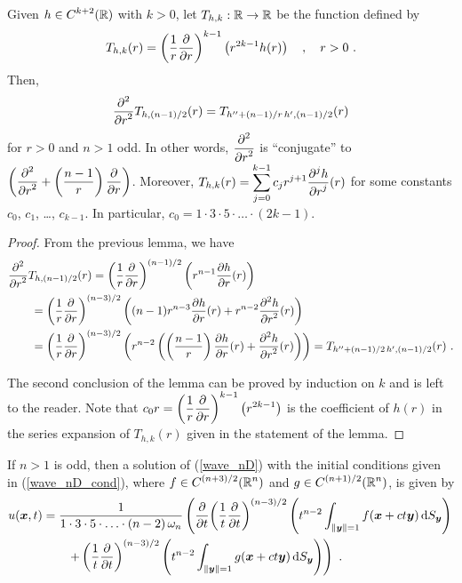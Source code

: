 \begin{lemma} \label{wave_sol_pr2}
Given $\displaystyle h \in C^{k+2}(\RR)$ with $k>0$, let
$T_{h,k}:\RR \rightarrow \RR$ be the function defined by
\[
T_{h,k}(r) = \left(\frac{1}{r}\pdydx{}{r}\right)^{k-1}
\left(r^{2k-1} h(r)\right) \quad , \quad  r >0  \ .
\]
Then,
\[
\pdfdxn{ T_{h,(n-1)/2} }{r}{2}(r) = T_{h'' +(n-1)/r\,h',(n-1)/2}(r)
\]
for $r > 0$ and $n>1$ odd.
In other words, $\displaystyle \pdydxn{}{r}{2}$ is ``conjugate'' to
$\displaystyle \left(\pdydxn{}{r}{2}
+ \left(\frac{n-1}{r}\right)\pdydx{}{r}\right)$.
Moreover,
$\displaystyle
T_{h,k}(r) = \sum_{j=0}^{k-1} c_j r^{j+1} \pdydxn{h}{r}{j}(r)$
for some constants $c_0$, $c_1$, \ldots, $c_{k-1}$.  In particular,
$\displaystyle c_0 = 1 \cdot 3 \cdot 5 \cdot \ldots \cdot (2k-1)$.
\end{lemma}

\begin{proof}
From the previous lemma, we have
\begin{align*}
&\pdfdxn{ T_{h,(n-1)/2} }{r}{2}(r) =
\left(\frac{1}{r} \pdydx{}{r}\right)^{(n-1)/2}
\left( r^{n-1} \pdydx{h}{r}(r)\right) \\
&\qquad = \left(\frac{1}{r} \pdydx{}{r}\right)^{(n-3)/2}
\left( (n-1)r^{n-3} \pdydx{h}{r}(r) + r^{n-2} \pdydxn{h}{r}{2}(r)
\right) \\
&\qquad = \left(\frac{1}{r} \pdydx{}{r}\right)^{(n-3)/2}
\left( r^{n-2} \left( \left( \frac{n-1}{r}\right) \pdydx{h}{r}(r)
+\pdydxn{h}{r}{2}(r) \right) \right)
= T_{h''+(n-1)/2\, h', (n-1)/2}(r) \ .
\end{align*}

The second conclusion of the lemma can be proved by induction on $k$
and is left to the reader.  Note that
$\displaystyle c_0 r = \left(\frac{1}{r}\pdydx{}{r}\right)^{k-1}
\left(r^{2k-1}\right)$ is the coefficient of $h(r)$ in the series
expansion of $T_{h,k}(r)$ given in the statement of the lemma. 
\end{proof}

\begin{theorem} \label{wave_sol_nD_odd}
If $n > 1$ is odd, then a solution of
(\ref{wave_nD}) with the initial conditions given in
(\ref{wave_nD_cond}), where $\displaystyle f\in C^{(n+3)/2}(\RR^n)$ and
$\displaystyle g\in C^{(n+1)/2}(\RR^n)$, is given by
\begin{equation} \label{wave_sol_nD_oddEQ}
\begin{split} 
u(\VEC{x},t) &= \frac{1}{1\cdot 3 \cdot 5 \cdot \ldots \cdot (n-2)
\,\omega_n}
\left( \pdfdx{ \left( \frac{1}{t} \pdydx{}{t} \right)^{(n-3)/2} }{t}
\left( t^{n-2} \int_{\|\VEC{y}\|=1} f(\VEC{x} + ct \VEC{y})
\dss{S}{y} \right)  \right. \\
& \qquad \left. + \left( \frac{1}{t} \pdydx{}{t} \right)^{(n-3)/2}
\left( t^{n-2} \int_{\|\VEC{y}\|=1} g(\VEC{x}+ ct \VEC{y})
\dss{S}{y} \right) \right) \ .
\end{split}
\end{equation}
\end{theorem}

